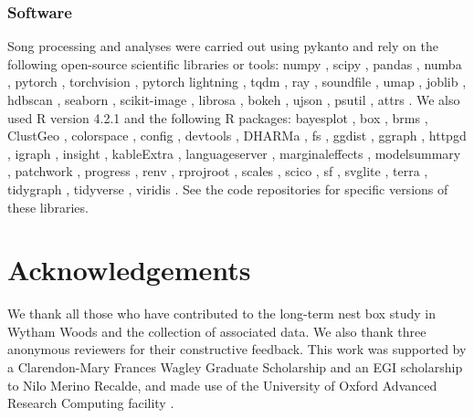 \subsubsection{Software}
\begin{sloppypar}
Song processing and analyses were carried out using pykanto \autocite{merinorecalde2023} and rely on the following open-source scientific libraries or tools: numpy \autocite{numpy2020}, scipy \autocite{scipy2020}, pandas \autocite{pandas2023}, numba \autocite{lam2015}, pytorch \autocite{pytorch2019}, torchvision \autocite{torchvision2016}, pytorch lightning \autocite{pytorchlightning2019}, tqdm \autocite{tqdm2019}, ray \autocite{moritz2018}, soundfile \autocite{bechtold2022}, umap \autocite{mcinnes2018},  joblib \autocite{joblib2020}, hdbscan \autocite{mcinnes2017}, seaborn \autocite{Waskom2021}, scikit-image \autocite{scikitimage2014}, librosa \autocite{mcfee2015}, bokeh \autocite{bokeh2018}, ujson \autocite{ujason2023}, psutil \autocite{psutil2023}, attrs \autocite{schlawack2019}. We also used R version 4.2.1 \autocite{base} and the following R packages: bayesplot \autocite{bayesplot2019, bayesplot2022}, box \autocite{box}, brms \autocite{brms2017, brms2021}, ClustGeo \autocite{ClustGeo}, colorspace \autocite{colorspace2020a}, config \autocite{config}, devtools \autocite{devtools}, DHARMa \autocite{DHARMa}, fs \autocite{fs}, ggdist \autocite{ggdist}, ggraph \autocite{ggraph}, httpgd \autocite{httpgd}, igraph \autocite{igraph2006, igraph2024}, insight \autocite{insight}, kableExtra \autocite{kableExtra}, languageserver \autocite{languageserver}, marginaleffects \autocite{marginaleffects}, modelsummary \autocite{modelsummary}, patchwork \autocite{patchwork}, progress \autocite{progress}, renv \autocite{renv}, rprojroot \autocite{rprojroot}, scales \autocite{scales}, scico \autocite{scico}, sf \autocite{sf2018, sf2023}, svglite \autocite{svglite}, terra \autocite{terra}, tidygraph \autocite{tidygraph}, tidyverse \autocite{tidyverse}, viridis \autocite{viridis}. See the code repositories for specific versions of these libraries.
\end{sloppypar}


\section{Acknowledgements}

We thank all those who have contributed to the long-term nest box study in Wytham Woods and the collection of associated data. We also thank three anonymous reviewers for their constructive feedback. This work was supported by a Clarendon-Mary Frances Wagley Graduate Scholarship and an EGI scholarship to Nilo Merino Recalde, and made use of the University of Oxford Advanced Research Computing facility \autocite{richards2015}.


